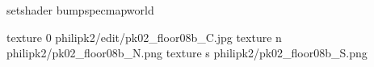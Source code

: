 setshader bumpspecmapworld

texture 0 philipk2/edit/pk02_floor08b_C.jpg
texture n philipk2/pk02_floor08b_N.png
texture s philipk2/pk02_floor08b_S.png

